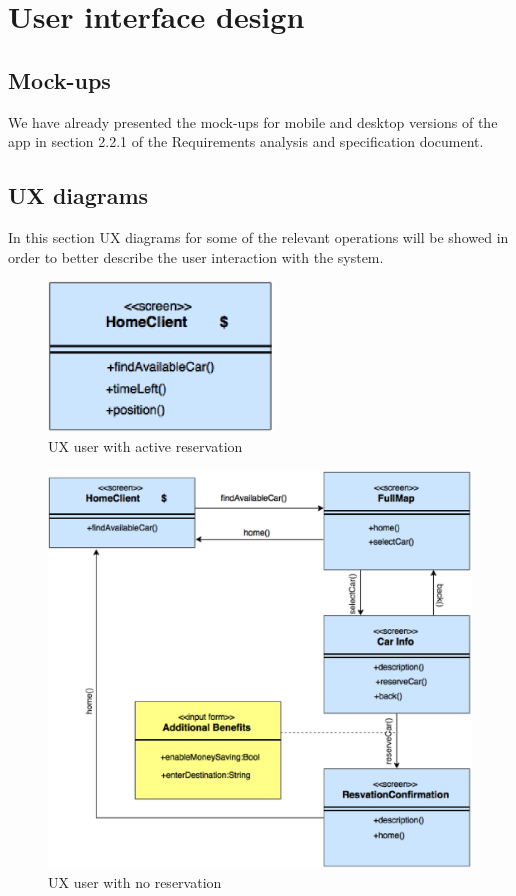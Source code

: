 \chapter{User interface design}

\section{Mock-ups}
We have already presented the mock-ups for mobile and desktop versions of the app in section 2.2.1 of the Requirements analysis and specification document.

\section{UX diagrams}
In this section UX diagrams for some of the relevant operations will be showed in order to better describe the user interaction with the system.

\begin{figure}[h]
	\centering
	\includegraphics[width=6cm,keepaspectratio]{figures/resv_ux_diagram.eps}
	\caption{UX user with active reservation}
	\label{fig:resv_ux_diagram}
\end{figure}

\begin{figure}[h]
	\centering
	\includegraphics[width=\linewidth,keepaspectratio]{figures/notresv_ux_diagram.eps}
	\caption{UX user with no reservation}
	\label{fig:notresv_ux_diagram}
\end{figure}

